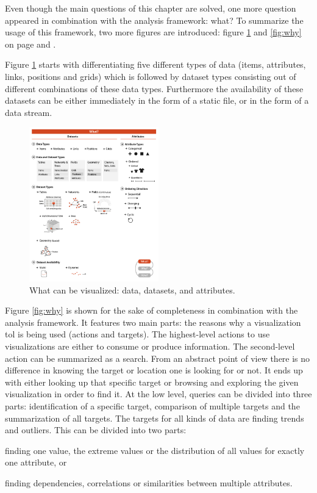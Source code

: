 Even though the main questions of this chapter are solved, one more question appeared in combination with the analysis framework: what? To summarize the usage of this framework, two more figures are introduced: figure \ref{fig:what} and \ref{fig:why} on page \pageref{fig:what} and \pageref{fig:why}.

Figure \ref{fig:what} starts with differentiating five different types of data (items, attributes, links, positions and grids) which is followed by dataset types consisting out of different combinations of these data types. Furthermore the availability of these datasets can be either immediately in the form of a static file, or in the form of a data stream.

\begin{figure}[!htb]
\centering
\includegraphics[width=0.5\textwidth,keepaspectratio]{images/basics/what.png}
\caption[
    What can be visualized: data, datasets, and attributes .
]{What can be visualized: data, datasets, and attributes.}
\label{fig:what}
\end{figure}

Figure \ref{fig:why} is shown for the sake of completeness in combination with the analysis framework. It features two main parts: the reasons why a visualization tol is being used (actions and targets). The highest-level actions to use visualizations are either to consume or produce information. The second-level action can be summarized as a search. From an abstract point of view there is no difference in knowing the target or location one is looking for or not. It ends up with either looking up that specific target or browsing and exploring the given visualization in order to find it. At the low level, queries can be divided into three parts: identification of a specific target, comparison of multiple targets and the summarization of all targets.
The targets for all kinds of data are finding trends and outliers. This can be divided into two parts:
\begin{enumeration*}
\item finding one value, the extreme values or the distribution of all values for exactly one attribute, or
\item finding dependencies, correlations or similarities between multiple attributes.
\end{enumeration*}

